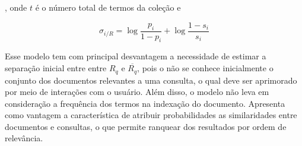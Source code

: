 , onde $t$ é o número total de termos da coleção e 

\begin{equation}
	\sigma_{i/R} = \log \frac{p_i}{1-p_i} + \log \frac{1-s_i}{s_i}
\end{equation}


Esse modelo tem com principal desvantagem a necessidade de estimar a separação inicial entre entre $R_q$ e $\overline{R_q}$, pois o não se conhece inicialmente o conjunto dos documentos relevantes a uma consulta, o qual deve ser aprimorado por meio de interações com o usuário. Além disso, o modelo não leva em consideração a frequência dos termos na indexação do documento. Apresenta como vantagem a característica de atribuir probabilidades as similaridades entre documentos e consultas, o que permite ranquear dos resultados por ordem de relevância. 












